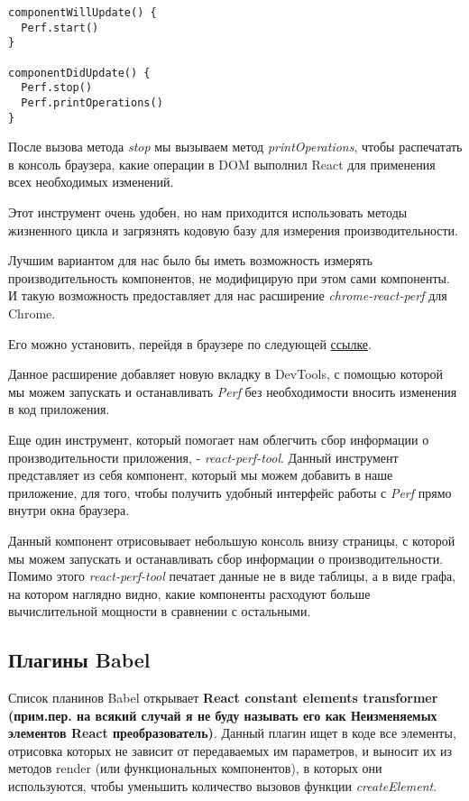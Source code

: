 \begin{lstlisting}
componentWillUpdate() {
  Perf.start()
}

componentDidUpdate() {
  Perf.stop()
  Perf.printOperations()
}
\end{lstlisting}

После вызова метода \textit{stop} мы вызываем метод \textit{printOperations}, чтобы распечатать в консоль браузера, какие операции в DOM выполнил React для применения всех необходимых изменений.

Этот инструмент очень удобен, но нам приходится использовать методы жизненного цикла и загрязнять кодовую базу для измерения производительности.

Лучшим вариантом для нас было бы иметь возможность измерять производительность компонентов, не модифицирую при этом сами компоненты. И такую возможность предоставляет для нас расширение \textit{chrome-react-perf} для Chrome.

Его можно установить, перейдя в браузере по следующей \href{https://chrome.google.com/webstore/detail/reactperf/hacmcodfllhbnekmghgdlplbdnahmhmm}{ссылке}.

Данное расширение добавляет новую вкладку в DevTools, с помощью которой мы можем запускать и останавливать \textit{Perf} без необходимости вносить изменения в код приложения.

Еще один инструмент, который помогает нам облегчить сбор информации о производительности приложения, - \textit{react-perf-tool}. Данный инструмент представляет из себя компонент, который мы можем добавить в наше приложение, для того, чтобы получить удобный интерфейс работы с \textit{Perf} прямо внутри окна браузера.

Данный компонент отрисовывает небольшую консоль внизу страницы, с которой мы можем запускать и останавливать сбор информации о производительности. Помимо этого \textit{react-perf-tool} печатает данные не в виде таблицы, а в виде графа, на котором наглядно видно,  какие компоненты расходуют больше вычислительной мощности в сравнении с остальными. 

\subsection{Плагины Babel}

Список планинов Babel открывает \textbf{React constant elements transformer (прим.пер. на всякий случай я не буду называть его как Неизменяемых элементов React преобразователь)}. Данный плагин ищет в коде все элементы, отрисовка которых не зависит от передаваемых им параметров, и выносит их из методов render (или функциональных компонентов), в которых они используются, чтобы уменьшить количество вызовов функции \textit{createElement}.

